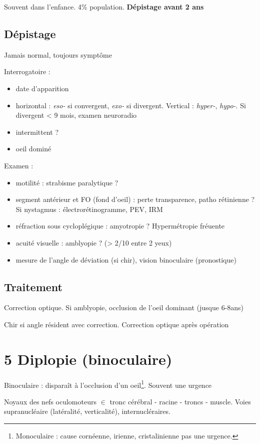 \documentclass[11pt]{article}
\begin{document}
Souvent dans l'enfance. 4\% population. \textbf{Dépistage avant 2 ans}

\subsection{Dépistage}
\label{sec:orgd63d334}
Jamais normal, toujours symptôme

Interrogatoire :
\begin{itemize}
\item date d'apparition
\item horizontal : \emph{eso-} si convergent, \emph{exo-} si divergent. Vertical : \emph{hyper-},
\emph{hypo-}. Si divergent < 9 mois, examen neuroradio
\item intermittent ?
\item oeil dominé
\end{itemize}

Examen : 
\begin{itemize}
\item motilité : strabisme paralytique ?
\item segment antérieur et FO (fond d'oeil) : perte transparence, patho rétinienne ? Si nystagmus : électrorétinogramme, PEV, IRM
\item réfraction sous cycloplégique : amyotropie ? Hypermétropie fréuente
\item acuité visuelle : amblyopie ? (> 2/10 entre 2 yeux)
\item mesure de l'angle de déviation (si chir), vision binoculaire (pronostique)
\end{itemize}

\subsection{Traitement}
\label{sec:orgb6d5055}
Correction optique. Si amblyopie, occlusion de l'oeil dominant (jusque 6-8ans)

Chir si angle résident avec correction. Correction optique après opération
\section{5 Diplopie (binoculaire)}
\label{sec:orgf2ff00e}
Binoculaire : disparaît à l'occlusion d'un oeil\footnote{Monoculaire : cause cornéenne, irienne, cristalinienne \thus pas une urgence.}. Souvent une urgence
\danger

Noyaux des nefs oculomoteurs \(\in\) tronc cérébral - racine - troncs -
muscle. Voies supranucléaire (latéralité, verticalité), internucléraires.
\end{document}
